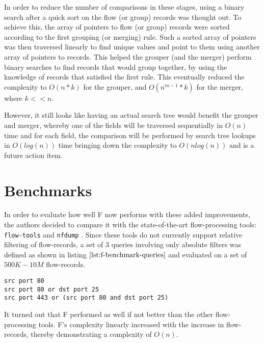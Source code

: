 In order to reduce the number of comparisons in these stages, using a binary search after a quick sort on the flow (or group) records was thought out. To achieve this, the array of pointers to flow (or group) records were sorted according to the first grouping (or merging) rule. Such a sorted array of pointers was then  traversed linearly to find unique values and point to them using another array of pointers to records. This helped the grouper (and the merger) perform binary searches to find records that would group together, by using the knowledge of records that satisfied the first rule. This eventually reduced the complexity to $O(n*k)$ for the grouper, and $O(n^{m-1} *k)$ for the merger, where $k << n$. 

However, it still looks like having an actual search tree would benefit the grouper and merger, whereby one of the fields will be traversed sequentially in $O(n)$  time and for each field, the comparison will be performed by search tree lookups in $O(log(n))$ time bringing down the complexity to $O(nlog(n))$ and is a future action item.

\section{Benchmarks}\label{sec:f-benchmarks}
In order to evaluate how well F now performs with these added improvements, the authors decided to compare it with the state-of-the-art flow-processing tools: \texttt{flow-tools} \cite{sromig:2000} and \texttt{nfdump} \cite{phaag:2006}. Since these  tools do not currently support relative filtering of flow-records, a set of $3$ queries involving only absolute filters was defined as shown in listing $\ref{lst:f-benchmark-queries}$ and evaluated on a set of $500K-10M$ flow-records.  

\begin{lstlisting}
src port 80
src port 80 or dst port 25
src port 443 or (src port 80 and dst port 25)
\end{lstlisting}

It turned out that F performed as well if not better than the other flow-processing tools. F's complexity linearly increased with the increase in flow-records, thereby demonstrating a complexity of $O(n)$.